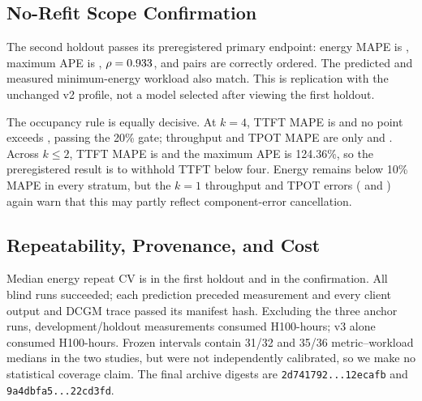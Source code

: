 

\subsection{No-Refit Scope Confirmation}

The second holdout passes its preregistered primary endpoint: energy MAPE is
\ConfirmationEnergyMAPE{}, maximum APE is \ConfirmationEnergyMaxAPE{},
$\rho=0.933{}$, and \ConfirmationEnergyPairwise{} pairs
are correctly ordered.  The predicted and measured minimum-energy workload
also match.  This is replication with the unchanged v2 profile, not a model
selected after viewing the first holdout.





The occupancy rule is equally decisive.  At $k=4$, TTFT MAPE is
\KFourTTFTMAPE{} and no point exceeds \SupportedTTFTMaxAPE{}, passing the 20\%
gate; throughput and TPOT MAPE are only \KFourThroughputMAPE{} and
\KFourTPOTMAPE{}.  Across $k\leq2$, TTFT MAPE is \SparseTTFTMAPE{} and the
maximum APE is 124.36\%, so the preregistered result is to withhold TTFT below
four.  Energy remains below 10\% MAPE in every stratum, but the $k=1$
throughput and TPOT errors (\KOneThroughputMAPE{} and \KOneTPOTMAPE{}) again
warn that this may partly reflect component-error cancellation.

\subsection{Repeatability, Provenance, and Cost}

Median energy repeat CV is \EnergyRepeatCV{} in the first holdout and
\ConfirmationEnergyRepeatCV{} in the confirmation.  All \BlindMeasurements{}
blind runs succeeded; each prediction preceded measurement and every client
output and DCGM trace passed its manifest hash.  Excluding the three anchor
runs, \MeasuredRunsExcludingAnchors{} development/holdout measurements consumed
\TotalCampaignGPUHours{} H100-hours; v3 alone consumed
\ConfirmationGPUHours{} H100-hours.  Frozen intervals contain 31/32 and 35/36
metric--workload medians in the two studies, but were not independently
calibrated, so we make no statistical coverage claim.  The final archive
digests are \texttt{2d741792...12ecafb} and
\texttt{9a4dbfa5...22cd3fd}.
